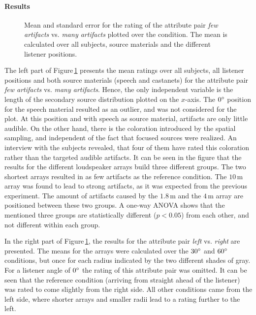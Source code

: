 \paragraph{Results}
\begin{figure}
    \small
    \centering
    
    \caption{Mean and standard error for the
        rating of the attribute pair \emph{few artifacts} vs. \emph{many
        artifacts} plotted over the condition.
        The mean is calculated over all subjects,
        source materials and the different listener positions.
    }
    \label{fig:fs_exp2_results}
\end{figure}
%
The left part of Figure\,\ref{fig:fs_exp2_results} presents the mean ratings
over all subjects, all listener positions and both source materials (speech and
castanets) for the attribute pair \emph{few artifacts} vs. \emph{many
artifacts}.  Hence, the only independent variable is the length of the secondary
source distribution plotted on the $x$-axis.
The $0^\circ$ position for the speech material
resulted as an outlier, and was not considered for the plot.  At this position
and with speech as source material, artifacts are only little audible.  On the
other hand, there is the coloration introduced by the spatial sampling, and
independent of the fact that focused sources were realized. An interview with
the subjects revealed, that four of them have rated this coloration rather than
the targeted audible artifacts.  It can be seen in the figure that the results
for the different loudspeaker arrays build three different groups.  The two
shortest arrays resulted in as few artifacts as the reference condition.  The
$10$\,m array was found to lead to strong artifacts, as it was expected from the
previous experiment. The amount of artifacts caused by the $1.8$\,m and the
$4$\,m array are positioned between these two groups.  A one-way ANOVA shows
that the mentioned three groups are statistically different ($p < 0.05$) from
each other, and not different within each group.

In the right part of Figure\,\ref{fig:fs_exp2_results}, the results for the
attribute pair \emph{left} vs. \emph{right} are presented. The means for
the arrays were calculated over the $30^\circ$ and $60^\circ$ conditions,
but once for each radius indicated by the two different shades of gray. For a
listener angle of $0^\circ$ the rating of this attribute pair was omitted.
It can be seen that the reference condition (arriving from straight ahead
of the listener) was rated to come slightly from the right side. All other
conditions came from the left side, where shorter arrays and smaller radii
lead to a rating further to the left.

